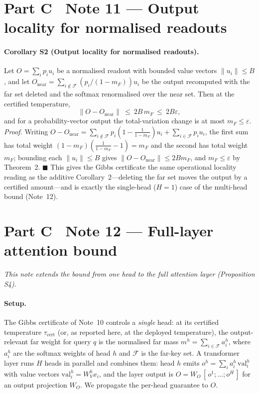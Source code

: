 \documentclass[10pt,twocolumn]{article}
\begin{document}
\section*{Part C \textperiodcentered\ Note 11 --- Output locality for normalised readouts}
\FloatBarrier
{}
\paragraph{Corollary S2 (Output locality for normalised readouts).} Let $O=\sum_i p_i u_i$ be a normalised readout with bounded value vectors $\lVert u_i\rVert\le B$, and let $O_{\mathrm{near}}=\sum_{i\notin\mathcal{F}}(p_i/(1-m_F))u_i$ be the output recomputed with the far set deleted and the softmax renormalised over the near set. Then at the certified temperature,
\begin{equation}
\lVert O-O_{\mathrm{near}}\rVert\ \le\ 2B\,m_F\ \le\ 2B\varepsilon,
\end{equation}
and for a probability-vector output the total-variation change is at most $m_F\le\varepsilon$. \emph{Proof.} Writing $O-O_{\mathrm{near}}=\sum_{i\notin\mathcal{F}}p_i(1-\tfrac1{1-m_F})u_i+\sum_{i\in\mathcal{F}}p_i u_i$, the first sum has total weight $(1-m_F)(\tfrac1{1-m_F}-1)=m_F$ and the second has total weight $m_F$; bounding each $\lVert u_i\rVert\le B$ gives $\lVert O-O_{\mathrm{near}}\rVert\le 2Bm_F$, and $m_F\le\varepsilon$ by Theorem~2. $\blacksquare$ This gives the Gibbs certificate the same operational locality reading as the additive Corollary~2---deleting the far set moves the output by a certified amount---and is exactly the single-head ($H{=}1$) case of the multi-head bound (Note~12).

\section*{Part C \textperiodcentered\ Note 12 --- Full-layer attention bound}
\label{si:mha}
\emph{This note extends the bound from one head to the full attention layer (Proposition S4).}
\paragraph{Setup.} The Gibbs certificate of Note~10 controls a \emph{single} head: at its certified temperature $\tau_{\mathrm{cert}}$ (or, as reported here, at the deployed temperature), the output-relevant far weight for query $q$ is the normalised far mass $m^h=\sum_{i\in\mathcal{F}}a^h_i$, where $a^h_i$ are the softmax weights of head $h$ and $\mathcal{F}$ is the far-key set. A transformer layer runs $H$ heads in parallel and combines them: head $h$ emits $o^h=\sum_i a^h_i\,\mathrm{val}^h_i$ with value vectors $\mathrm{val}^h_i=W_V^h x_i$, and the layer output is $O=W_O\,[\,o^1;\dots;o^H\,]$ for an output projection $W_O$. We propagate the per-head guarantee to $O$.
\end{document}
